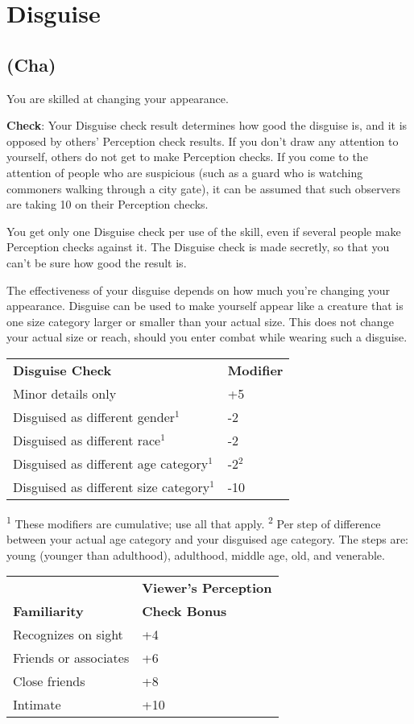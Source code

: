 \section{Disguise}

\label{f0}
\subsection{(Cha)}

				
You are skilled at changing your appearance.
				
\textbf{Check}: Your Disguise check result determines how good the disguise is, and it is opposed by others' Perception check results. If you don't draw any attention to yourself, others do not get to make Perception checks. If you come to the attention of people who are suspicious (such as a guard who is watching commoners walking through a city gate), it can be assumed that such observers are taking 10 on their Perception checks.
				
You get only one Disguise check per use of the skill, even if several people make Perception checks against it. The Disguise check is made secretly, so that you can't be sure how good the result is.
				
The effectiveness of your disguise depends on how much you're changing your appearance. Disguise can be used to make yourself appear like a creature that is one size category larger or smaller than your actual size. This does not change your actual size or reach, should you enter combat while wearing such a disguise.


\begin{table}
 \sffamily
 \begin{tabularx}{\linewidth}{lX}
\textbf{Disguise Check} & \textbf{Modifier}\\
Minor details only & +5\\
Disguised as different gender\(^{1}\) & -2\\
Disguised as different race\(^{1}\) & -2\\
Disguised as different age category\(^{1}\) & -2\(^{2}\) \\
Disguised as different size category\(^{1}\) & -10 \\
 \end{tabularx}
 \textsuperscript{1} These modifiers are cumulative; use all that apply.
\textsuperscript{2} Per step of difference between your actual age category and your disguised age category. The steps are: young (younger than adulthood), adulthood, middle age, old, and venerable.
\end{table}
\begin{table}
\sffamily
 \begin{tabular}{ll}
                      & \textbf{Viewer's Perception } \\
\textbf{Familiarity}  & \textbf{Check Bonus}\\
Recognizes on sight & +4\\
Friends or associates & +6\\
Close friends & +8\\
Intimate & +10\\
 \end{tabular}
\end{table}


